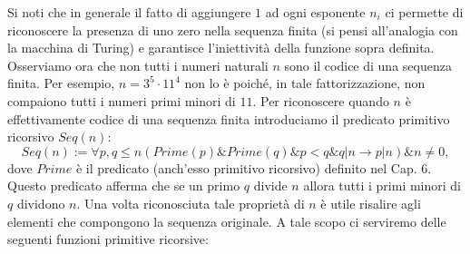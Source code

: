 Si noti che in generale il fatto di aggiungere $1$ ad ogni esponente $n_i$ ci permette di riconoscere la presenza di uno zero nella sequenza finita (si pensi all'analogia con la macchina di Turing) e garantisce l'iniettivit\`a della funzione sopra definita. Osserviamo ora che non tutti i numeri naturali $n$ sono il codice di una sequenza finita. Per esempio, $n = 3^5\cdot 11^4$ non lo \`e poich\'e, in tale fattorizzazione, non compaiono tutti i numeri primi minori di $11$. Per riconoscere quando $n$ \`e effettivamente codice di una sequenza finita introduciamo il predicato primitivo ricorsivo $Seq(n)$:
$$
Seq(n) := \forall p,q \leq n (Prime(p) \& Prime(q) \& p < q \& q|n \rightarrow p|n) \& n\ne 0,
$$
 dove  $Prime$ \`e il predicato (anch'esso primitivo ricorsivo) definito nel Cap. $6$. Questo predicato afferma che se un primo $q$ divide $n$ allora tutti i primi minori di $q$ dividono $n$.
 Una volta riconosciuta tale propriet\`a di $n$ \`e utile risalire agli elementi che compongono la sequenza originale. A tale scopo ci serviremo delle seguenti funzioni primitive ricorsive:
